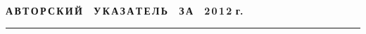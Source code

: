 
\def\stat{cont}
{%
\raggedleft\Large \bf%
А\,В\,Т\,О\,Р\,С\,К\,И\,Й\ \ У\,К\,А\,З\,А\,Т\,Е\,Л\,Ь\ \ З\,А\ \ 2\,0\,1\,2 г. \vskip 17pt
    \hrule
    \par
{} }

\label{st\stat}

\def\tit{\ }

\def\aut{\ }
\def\auf{\ }

\def\leftkol{\ } %

\def\rightkol{\ } %

\titele{\tit}{\aut}{\auf}{\leftkol}{\rightkol}

\vspace*{-12pt}

